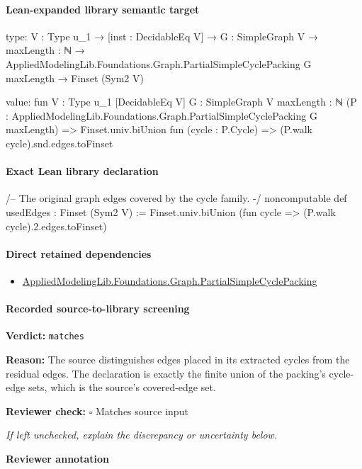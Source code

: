 \documentclass[10pt]{article}
\newcommand{\reviewerbox}{%
  \par\noindent\fbox{\parbox{0.96\linewidth}{\rule{0pt}{0.38in}}}\par
}
\newcommand{\reviewmatch}[1]{%
  \par\noindent\textbf{Reviewer check:} $\square$\; #1\par
  \noindent\emph{If left unchecked, explain the discrepancy or uncertainty below.}\par
}
\begin{document}
\paragraph{Lean-expanded library semantic target}
\begin{ReviewVerbatim}
type:
{V : Type u_1} →
  [inst : DecidableEq V] →
    {G : SimpleGraph V} →
      {maxLength : ℕ} → AppliedModelingLib.Foundations.Graph.PartialSimpleCyclePacking G maxLength → Finset (Sym2 V)

value:
fun {V : Type u_1} [DecidableEq V] {G : SimpleGraph V} {maxLength : ℕ}
    (P : AppliedModelingLib.Foundations.Graph.PartialSimpleCyclePacking G maxLength) =>
  Finset.univ.biUnion fun (cycle : P.Cycle) => (P.walk cycle).snd.edges.toFinset
\end{ReviewVerbatim}

\paragraph{Exact Lean library declaration}
\begin{ReviewVerbatim}
/-- The original graph edges covered by the cycle family. -/
noncomputable def usedEdges : Finset (Sym2 V) :=
  Finset.univ.biUnion (fun cycle => (P.walk cycle).2.edges.toFinset)
\end{ReviewVerbatim}

\paragraph{Direct retained dependencies}
\begin{itemize}\raggedright
\item \hyperlink{library-prerequisite-ce93e94db97efbc5}{Applied\allowbreak{}Modeling\allowbreak{}Lib.\allowbreak{}Foundations.\allowbreak{}Graph.\allowbreak{}Partial\allowbreak{}Simple\allowbreak{}Cycle\allowbreak{}Packing}
\end{itemize}
\paragraph{Recorded source-to-library screening}
\textbf{Verdict:} \texttt{matches}
\\
{\raggedright
\textbf{Reason:} The source distinguishes edges placed in its extracted cycles from the residual edges.\allowbreak{} The declaration is exactly the finite union of the packing's cycle-\allowbreak{}edge sets, which is the source's covered-\allowbreak{}edge set.\allowbreak{}
\par}
\reviewmatch{Matches source input}
\noindent\textbf{Reviewer annotation}\par
\reviewerbox
\clearpage
\hypertarget{library-prerequisite-44e965e1fe85fa7e}{}
\end{document}
